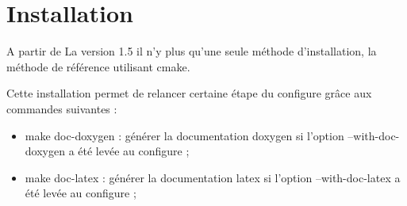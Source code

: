 \documentclass[12pt]{article}
\begin{document}
\section{Installation}

A partir de La version 1.5 il n'y plus qu'une seule méthode d'installation, la méthode de référence utilisant cmake.

Cette installation permet de relancer certaine étape du configure grâce aux commandes suivantes :
\begin{itemize}
\item make doc-doxygen : générer la documentation doxygen si l'option --with-doc-doxygen a été levée au configure ;
\item make doc-latex : générer la documentation latex si l'option --with-doc-latex a été levée au configure ; 
\end{itemize}
%
\end{document}
